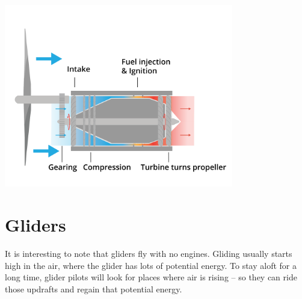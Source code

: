 \includegraphics[width=0.75\textwidth]{turboProp.png}


\section{Gliders}

It is interesting to note that gliders fly with no engines.   Gliding usually starts high in the air,  where the glider has lots of potential energy.   To stay aloft for a long
time,  glider pilots will look for places where air is rising -- so they can ride those updrafts and regain that potential energy.

